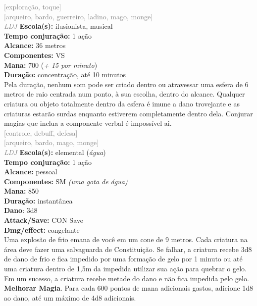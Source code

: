 \documentclass{RPG_Adventure}[2021/10/20]
\begin{document}
{\scriptsize \textcolor{gray}{[exploração, toque]\\}}
{\scriptsize \textcolor{gray}{[arqueiro, bardo, guerreiro, ladino, mago, monge]\\}}
{\tiny \textcolor{gray}{\textit{LDJ}}}
{\small \t \textbf{Escola(s):} ilusionista, musical\\\t \textbf{Tempo conjuração:} 1 ação\\\t \textbf{Alcance:} 36 metros\\\t \textbf{Componentes:} VS\\\t \textbf{Mana:} 700 (\textit{+ 15 por minuto})\\\t \textbf{Duração:} concentração, até 10 minutos\\}
{\normalsize Pela duração, nenhum som pode ser criado dentro ou atravessar uma esfera de 6 metros de raio centrada num ponto, à sua escolha, dentro do alcance. Qualquer criatura ou objeto totalmente dentro da esfera é imune a dano trovejante e as criaturas estarão surdas enquanto estiverem completamente dentro dela. Conjurar magias que inclua a componente verbal é impossível ai.\\}
{\scriptsize \textcolor{gray}{[controle, debuff, defesa]\\}}
{\scriptsize \textcolor{gray}{[arqueiro, bardo, mago, monge]\\}}
{\tiny \textcolor{gray}{\textit{LDJ}}}
{\small \t \textbf{Escola(s):} elemental (\textit{água})\\\t \textbf{Tempo conjuração:} 1 ação\\\t \textbf{Alcance:} pessoal\\\t \textbf{Componentes:} SM \textit{(uma gota de água)}\\\t \textbf{Mana:} 850\\\t \textbf{Duração:} instantânea\\\t \textbf{Dano}: 3d8\\\t \textbf{Attack/Save:} CON Save\\\t \textbf{Dmg/effect:} congelante\\}
{\normalsize Uma explosão de frio emana de você em um cone de 9 metros. Cada criatura na área deve fazer uma salvaguarda de Constituição. Se falhar, a criatura recebe 3d8 de dano de frio e fica impedido por uma formação de gelo por 1 minuto ou até uma criatura dentro de 1,5m da impedida utilizar sua ação para quebrar o gelo. Em um sucesso, a criatura recebe metade do dano e não fica impedida pelo gelo.\\\t \textbf{Melhorar Magia}. Para cada 600 pontos de mana adicionais gastos, adicione 1d8 ao dano, até um máximo de 4d8 adicionais.\\}
\end{document}
